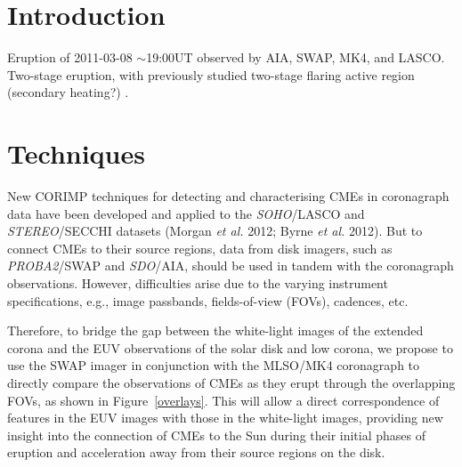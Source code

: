 \documentclass[preprint2]{aastex}
\begin{document}

\section{Introduction}
\label{sect_intro}

Eruption of 2011-03-08 $\sim$19:00UT observed by AIA, SWAP, MK4, and LASCO. Two-stage eruption, with previously studied two-stage flaring active region (secondary heating?) \citep{}.




\section{Techniques}

New CORIMP techniques for detecting and characterising CMEs in coronagraph data have been developed and applied to the \emph{SOHO}/LASCO and \emph{STEREO}/SECCHI datasets (Morgan \emph{et al.} 2012; Byrne \emph{et al.} 2012). But to connect CMEs to their source regions, data from disk imagers, such as \emph{PROBA2}/SWAP and \emph{SDO}/AIA, should be used in tandem with the coronagraph observations. However, difficulties arise due to the varying instrument specifications, e.g., image passbands, fields-of-view (FOVs), cadences, etc.

Therefore, to bridge the gap between the white-light images of the extended corona and the EUV observations of the solar disk and low corona, we propose to use the SWAP imager in conjunction with the MLSO/MK4 coronagraph to directly compare the observations of CMEs as they erupt through the overlapping FOVs, as shown in Figure~\ref{overlays}. This will allow a direct correspondence of features in the EUV images with those in the white-light images, providing new insight into the connection of CMEs to the Sun during their initial phases of eruption and acceleration away from their source regions on the disk.
\end{document}

